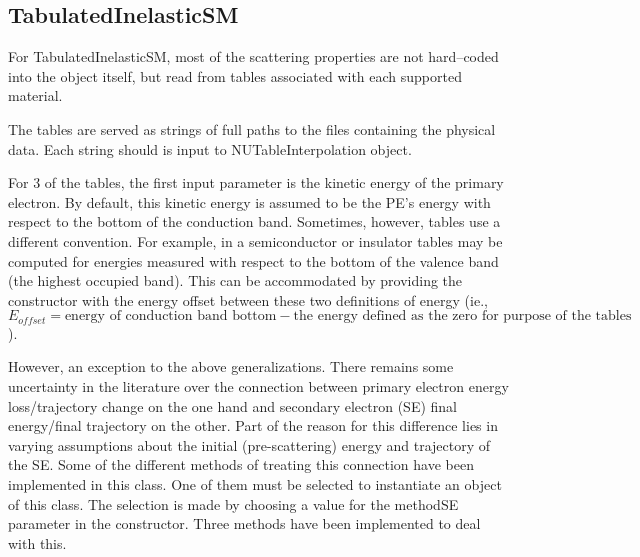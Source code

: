 \subsection{TabulatedInelasticSM}
For TabulatedInelasticSM, most of the scattering properties are not hard--coded into the object itself, but read from tables associated with each supported material.

The tables are served as strings of full paths to the files containing the physical data. Each string should is input to NUTableInterpolation object. 

For 3 of the tables, the first input parameter is the kinetic energy of the primary electron. By default, this kinetic energy is assumed to be the PE's energy with respect to the bottom of the conduction band. Sometimes, however, tables use a different convention. For example, in a semiconductor or insulator tables may be computed for energies measured with respect to the bottom of the valence band (the highest occupied band). This can be accommodated by providing the constructor with the energy offset between these two definitions of energy (ie., $E_{offset} = \text{energy of conduction band bottom} - \text{the energy defined as the zero for purpose of the tables}$).

However, an exception to the above generalizations. There remains some uncertainty in the literature over the connection between primary electron energy loss/trajectory change on the one hand and secondary electron (SE) final energy/final trajectory on the other. Part of the reason for this difference lies in varying assumptions about the initial (pre-scattering) energy and trajectory of the SE. Some of the different methods of treating this connection have been implemented in this class. One of them must be selected to instantiate an object of this class. The selection is made by choosing a value for the methodSE parameter in the constructor. Three methods have been implemented to deal with this.

